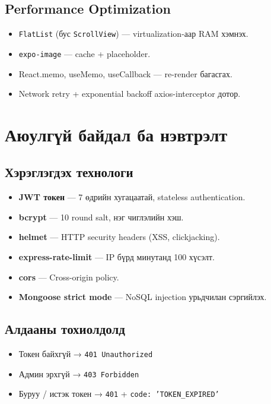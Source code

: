 \documentclass[12pt, a4paper]{report}
\begin{document}
\subsection{Performance Optimization}

\begin{itemize}
  \item \texttt{FlatList} (бус \texttt{ScrollView}) — virtualization-аар RAM хэмнэх.
  \item \texttt{expo-image} — cache + placeholder.
  \item React.memo, useMemo, useCallback — re-render багасгах.
  \item Network retry + exponential backoff axios-interceptor дотор.
\end{itemize}

\section{Аюулгүй байдал ба нэвтрэлт}

\subsection{Хэрэглэгдэх технологи}

\begin{itemize}
  \item \textbf{JWT токен} — 7 өдрийн хугацаатай, stateless authentication.
  \item \textbf{bcrypt} — 10 round salt, нэг чиглэлийн хэш.
  \item \textbf{helmet} — HTTP security headers (XSS, clickjacking).
  \item \textbf{express-rate-limit} — IP бүрд минутанд 100 хүсэлт.
  \item \textbf{cors} — Cross-origin policy.
  \item \textbf{Mongoose strict mode} — NoSQL injection урьдчилан сэргийлэх.
\end{itemize}

\subsection{Алдааны тохиолдолд}

\begin{itemize}
  \item Токен байхгүй → \texttt{401 Unauthorized}
  \item Админ эрхгүй → \texttt{403 Forbidden}
  \item Буруу / истэк токен → \texttt{401} + \texttt{code: 'TOKEN\_EXPIRED'}
\end{itemize}
\end{document}
